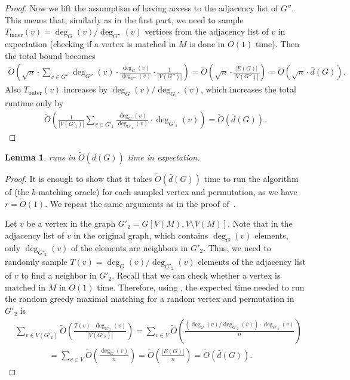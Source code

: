 \documentclass[letterpaper,11pt]{article}
\newcommand{\wt}[1]{\ensuremath{\widetilde{#1}}}
\newcommand{\Touter}{\ensuremath{T_{\mathrm{outer}}}}
\newcommand{\Tinner}{\ensuremath{T_{\mathrm{inner}}}}
\newtheorem{lemma}{Lemma}[section]
\begin{document}
\begin{proof}
    Now we lift the assumption of having access to the adjacency list of $G''$.
    This means that, similarly as in the first part, we need to sample $\Tinner(v) = \deg_G(v) / \deg_{G''}(v)$ vertices from the adjacency list of $v$ in expectation (checking if a vertex is matched in $M$ is done in $O(1)$ time).
    Then the total bound becomes
    \begin{align*}
    \wt{O}\left(\sqrt{n} \cdot \sum_{v \in G''} \deg_{G''}(v) \cdot \frac{\deg_G(v)}{\deg_{G''}(v)} \cdot \frac{1}{|V(G'')|}\right)
    = \wt{O}\left(\sqrt{n} \cdot \frac{|E(G)|}{|V(G'')|}\right)
    = \widetilde{O}(\sqrt{n} \cdot \bar{d}(G)) .
    \end{align*}
    Also $\Touter(v)$ increases by $\deg_G(v) / \deg_{G_1'}(v)$,
    which increases the total runtime only by
    \begin{align*}
        \wt{O}\left(\frac{1}{|V(G'_1)|} \sum_{v \in G'_1} \frac{\deg_G(v)}{\deg_{G'_1}(v)} \cdot \deg_{G'_1}(v) \right) = \wt{O}(\bar{d}(G)).
    \end{align*}
\end{proof}


\begin{lemma}\label{lem:second-alg-time}
     runs in $\widetilde{O}(\bar{d}(G))$ time in expectation.
\end{lemma}
\begin{proof}
    It is enough to show that it takes $\wt{O}(\bar{d}(G))$ time to run the algorithm of  (the $b$-matching oracle) for each sampled vertex and permutation, as we have $r = \wt{O}(1)$. 
    We repeat the same arguments as in the proof of~.
    
    Let $v$ be a vertex in the graph $G'_2 = G[V(M), V\setminus V(M)]$. Note that in the adjacency list of $v$ in the original graph, which contains $\deg_G(v)$ elements, only $\deg_{G'_2}(v)$ of the elements are neighbors in $G'_2$. Thus, we need to randomly sample $T(v) = \deg_G(v) / \deg_{G'_2}(v)$ elements of the adjacency list of $v$ to find a neighbor in $G'_2$.
    Recall that we can check whether a vertex is matched in $M$ in $O(1)$ time.
    Therefore, using , the expected time needed to run the random greedy maximal matching for a random vertex and permutation in $G'_2$ is
    \begin{align*}
        &\sum_{v \in V(G'_2)} 
    \wt{O}\left(\frac{T(v) \cdot \deg_{G'_2}(v)}{|V(G'_2)|}\right) = \sum_{v \in V} 
    \wt{O}\left(\frac{(\deg_G(v)/\deg_{G'_2}(v)) \cdot \deg_{G'_2}(v)}{n}\right)\\
    &\qquad \qquad = \sum_{v \in V} 
    \wt{O}\left(\frac{\deg_G(v)}{n}\right)
    = \wt{O}\left(\frac{|E(G)|}{n}\right)
    = \widetilde{O}(\bar{d}(G)).
    \end{align*}\end{proof}
\end{document}
